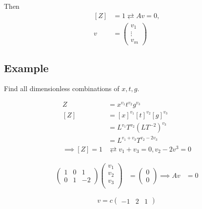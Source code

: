 \documentclass[12pt]{article}
\begin{document}
Then
\begin{equation}
  \begin{aligned}
    [Z] &= 1 \rightleftarrows Av=0, \\
    v &= \begin{pmatrix} v_1 \\ \vdots \\ v_m \end{pmatrix}
  \end{aligned}
\end{equation}

\subsection{Example}
Find all dimensionless combinations of $x, t, g$.

\begin{equation}
  \begin{aligned}
    Z &= x^{v_1}t^{v_2}g^{v_3} \\
    [Z] &= [x]^{v_1}[t]^{v_2}[g]^{v_3} \\
    &= L^{v_1}T^{v_2}(LT^{-2})^{v_3} \\
    &= L^{v_1+v_3} T^{v_2-2v_3} \\
    \implies [Z] = 1 & \rightleftarrows  v_1+v_3=0, v_2-2v^3=0
  \end{aligned}
\end{equation}

\begin{equation}
  \begin{aligned}
    \begin{pmatrix}
      1 & 0 & 1 \\
      0 & 1 & -2
    \end{pmatrix}
    \begin{pmatrix}
      v_1 \\ v_2 \\ v_3 \\
    \end{pmatrix}
    &=
    \begin{pmatrix}
      0 \\ 0
    \end{pmatrix}
    \implies Av &= 0
  \end{aligned}
\end{equation}

\begin{equation}
  v = c
  \begin{pmatrix}
    -1 & 2 & 1
  \end{pmatrix}
\end{equation}
\end{document}
